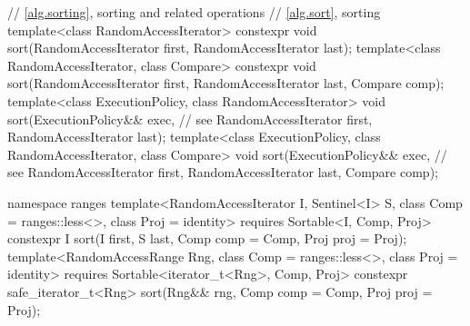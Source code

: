 \begin{codeblock}
  // \ref{alg.sorting}, sorting and related operations
  // \ref{alg.sort}, sorting
  template<class RandomAccessIterator>
    constexpr void sort(RandomAccessIterator first, RandomAccessIterator last);
  template<class RandomAccessIterator, class Compare>
    constexpr void sort(RandomAccessIterator first, RandomAccessIterator last,
              Compare comp);
  template<class ExecutionPolicy, class RandomAccessIterator>
    void sort(ExecutionPolicy&& exec, // see 
              RandomAccessIterator first, RandomAccessIterator last);
  template<class ExecutionPolicy, class RandomAccessIterator, class Compare>
    void sort(ExecutionPolicy&& exec, // see 
              RandomAccessIterator first, RandomAccessIterator last,
              Compare comp);
\end{codeblock}\begin{addedblock}\begin{codeblock}
  namespace ranges {
    template<RandomAccessIterator I, Sentinel<I> S, class Comp = ranges::less<>,
        class Proj = identity>
      requires Sortable<I, Comp, Proj>
      constexpr I
        sort(I first, S last, Comp comp = Comp{}, Proj proj = Proj{});
    template<RandomAccessRange Rng, class Comp = ranges::less<>, class Proj = identity>
      requires Sortable<iterator_t<Rng>, Comp, Proj>
      constexpr safe_iterator_t<Rng>
        sort(Rng&& rng, Comp comp = Comp{}, Proj proj = Proj{});
  }
\end{codeblock}\end{addedblock}\begin{codeblock}


\end{codeblock}
